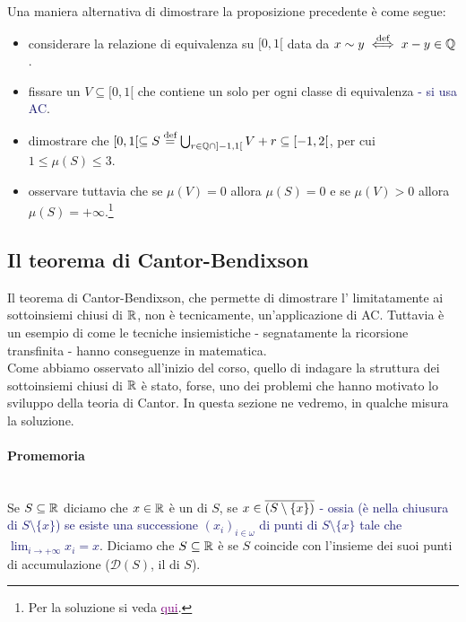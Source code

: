 \begin{exercise}
	Una maniera alternativa di dimostrare la proposizione precedente è come segue:
	\begin{itemize}
		\item considerare la relazione di equivalenza su $[0,1[$ data da $x \sim y \overset{\text{def}}{\iff} x - y \in \mathbb Q$.
		\item fissare un $V \subseteq [0,1[$ che contiene un solo per ogni classe di equivalenza \textcolor{MidnightBlue}{- si usa AC}.
		\item dimostrare che $[0,1[ \subseteq S \overset{\text{def}}{=} \bigcup_{r \in \mathbb Q \cap ]-1,1[} V + r \subseteq [-1,2[$, per cui $1 \leq \mu(S) \leq 3$.
		\item osservare tuttavia che se $\mu(V) = 0$ allora $\mu(S) = 0$ e se $\mu(V) > 0$ allora $\mu(S) = +\infty$.\footnote{Per la soluzione si veda \href{https://it.wikipedia.org/wiki/Insieme_di_Vitali}{\textcolor{purple}{qui}}.}
	\end{itemize}
\end{exercise}


\subsection{\texorpdfstring{\;Il teorema di Cantor-Bendixson}{Il teorema di Cantor-Bendixson}}
Il teorema di Cantor-Bendixson, che permette di dimostrare l' limitatamente ai sottoinsiemi chiusi di $\mathbb R$, non è tecnicamente, un'applicazione di AC.
Tuttavia è un esempio di come le tecniche insiemistiche - segnatamente la ricorsione transfinita - hanno conseguenze in matematica.\\
Come abbiamo osservato all'inizio del corso, quello di indagare la struttura dei sottoinsiemi chiusi di $\mathbb R$ è stato, forse, uno dei problemi che hanno motivato lo sviluppo della teoria di Cantor. In 
questa sezione ne vedremo, in qualche misura la soluzione.

\paragraph*{Promemoria}\mbox{}\\
Se $S \subseteq \mathbb R$ diciamo che $x \in \mathbb R$ è un  di $S$, se $x \in \overline{(S \setminus \{x\})}$ \textcolor{MidnightBlue}{- ossia (è nella chiusura di $S\setminus\{x\}$) se esiste una successione $(x_i)_{i \in \omega}$ di 
punti di $S \setminus \{x\}$ tale che $\lim_{i \to +\infty} x_i = x$}. Diciamo che $S \subseteq \mathbb R$ è  se $S$ coincide con l'insieme dei suoi punti di accumulazione ($\mathcal{D}(S)$, il  di $S$).

